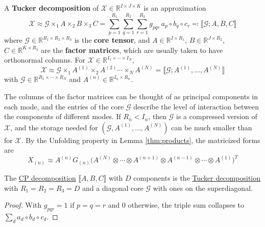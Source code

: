   \begin{definition}
    \label{def:tucker-decomposition}
    A \textbf{Tucker decomposition} of $\mathcal{X} \in \mathbb{R}^{I \times J \times K}$ is an approximation
    \begin{equation}
      \mathcal{X} \approx \mathcal{G} \times_1 A \times_2 B \times_3 C = \sum_{p=1}^{R_1} \sum_{q=1}^{R_2} \sum_{r=1}^{R_3} g_{pqr} \, a_p \circ b_q \circ c_r \eqqcolon \llbracket \mathcal{G}; A, B, C \rrbracket
    \end{equation}
    where $\mathcal{G} \in \mathbb{R}^{R_1 \times R_2 \times R_3}$ is the \textbf{core tensor}, and $A \in \mathbb{R}^{I \times R_1}$, $B \in \mathbb{R}^{J \times R_2}$, $C \in \mathbb{R}^{K \times R_3}$ are the \textbf{factor matrices}, which are usually taken to have orthonormal columns. For $\mathcal{X} \in \mathbb{R}^{I_1 \times \cdots \times I_N}$,
    \begin{equation}
      \mathcal{X} \approx \mathcal{G} \times_1 A^{(1)} \times_2 A^{(2)} \cdots \times_N A^{(N)} = \llbracket \mathcal{G}; A^{(1)}, \ldots, A^{(N)} \rrbracket
    \end{equation}
    with $\mathcal{G} \in \mathbb{R}^{R_1 \times \cdots \times R_N}$ and $A^{(n)} \in \mathbb{R}^{I_n \times R_n}$.
  \end{definition}

  The columns of the factor matrices can be thought of as principal components in each mode, and the entries of the core $\mathcal{G}$ describe the level of interaction between the components of different modes. If $R_n < I_n$, then $\mathcal{G}$ is a compressed version of $\mathcal{X}$, and the storage needed for $(\mathcal{G}, A^{(1)}, \ldots, A^{(N)})$ can be much smaller than for $\mathcal{X}$. By the Unfolding property in Lemma \ref{thm:products}, the matricized forms are
  \begin{equation}
    X_{(n)} \approx A^{(n)} G_{(n)} \big( A^{(N)} \otimes \cdots \otimes A^{(n+1)} \otimes A^{(n-1)} \otimes \cdots \otimes A^{(1)} \big)^T
  \end{equation}

  \begin{lemma}
    \label{thm:cp-is-a-special-case-of-tucker}
    The \hyperref[def:cp-decomposition]{CP decomposition} $\llbracket A, B, C \rrbracket$ with $D$ components is the \hyperref[def:tucker-decomposition]{Tucker decomposition} with $R_1 = R_2 = R_3 = D$ and a diagonal core $\mathcal{G}$ with ones on the superdiagonal.
  \end{lemma}
  \begin{proof}
    With $g_{pqr} = 1$ if $p = q = r$ and $0$ otherwise, the triple sum collapses to $\sum_{d} a_d \circ b_d \circ c_d$.
  \end{proof}

